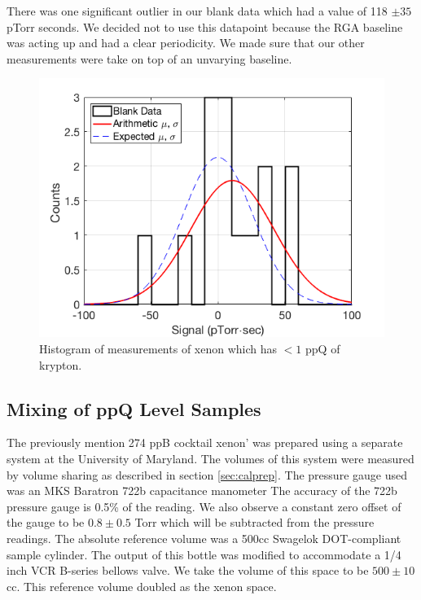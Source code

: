 \documentclass[12pt]{article}
\begin{document}
There was one significant outlier in our blank data which had a value of 118 $\pm35$ pTorr seconds. We decided not to use this datapoint because the RGA baseline was acting up and had a clear periodicity. We made sure that our other measurements were take on top of an unvarying baseline.
\begin{figure}[h!]
  \includegraphics[width=\linewidth]{Figures/BlankHist0217.png}
  \caption{Histogram of measurements of xenon which has $<1$ ppQ of  krypton.}
  \label{fig:senstrace}
\end{figure}


\subsection{Mixing of ppQ Level Samples}
The previously mention 274 ppB cocktail xenon' was prepared using a separate system at the University of Maryland. The volumes of this system were measured by volume sharing as described in section \ref{sec:calprep}. The pressure gauge used was an MKS Baratron 722b capacitance manometer The accuracy of the 722b pressure gauge is 0.5\% of the reading. We also observe a constant zero offset of the gauge to be $0.8\pm0.5$ Torr which will be subtracted from the pressure readings. The absolute reference volume was a 500cc Swagelok DOT-compliant sample cylinder. The output of this bottle was modified to accommodate a 1/4 inch VCR B-series bellows valve. We take the volume of this space to be $500 \pm10$cc. This reference volume doubled as the xenon space. 
\end{document}
